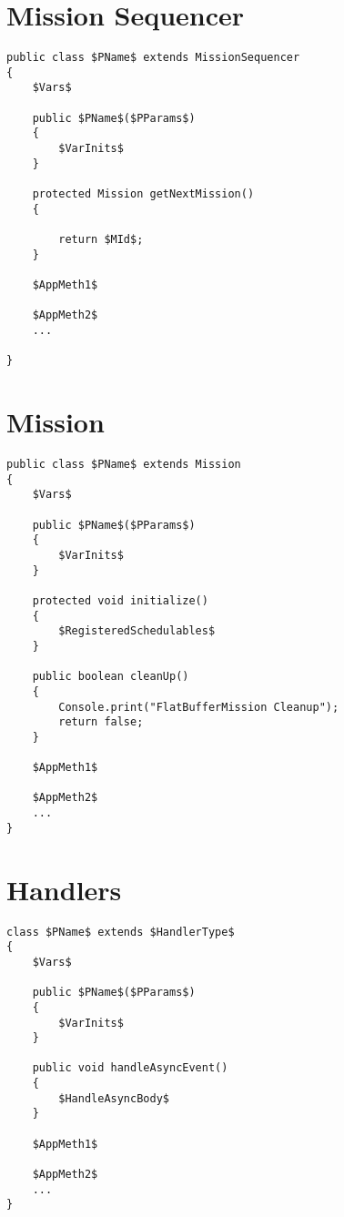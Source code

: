 \documentclass[11pt,a4paper]{article}
\begin{document}


\newpage

\section*{Mission Sequencer}

\begin{lstlisting}
public class $PName$ extends MissionSequencer
{
	$Vars$

	public $PName$($PParams$)
	{
		$VarInits$
	}
	
	protected Mission getNextMission()
	{
		
		return $MId$;		
	}
	
	$AppMeth1$
	
	$AppMeth2$
	...

}
\end{lstlisting}



\newpage

\section*{Mission}

\begin{lstlisting}
public class $PName$ extends Mission
{
	$Vars$

	public $PName$($PParams$)
	{
		$VarInits$
	}

	protected void initialize()
	{
		$RegisteredSchedulables$		
	}
	
	public boolean cleanUp()
	{
		Console.print("FlatBufferMission Cleanup");
		return false;
	}
	
	$AppMeth1$
	
	$AppMeth2$
	...
}
\end{lstlisting}

\newpage 

\section*{Handlers}

\begin{lstlisting}
class $PName$ extends $HandlerType$
{
	$Vars$
	
	public $PName$($PParams$)
	{
		$VarInits$
	}

	public void handleAsyncEvent()
	{
		$HandleAsyncBody$
	}
	
	$AppMeth1$
	
	$AppMeth2$
	...
}
\end{lstlisting}

\newpage 
\end{document}

